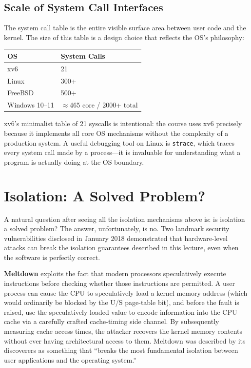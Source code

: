 \documentclass[11pt]{article}
\begin{document}
\subsection{Scale of System Call Interfaces}

The system call table is the entire visible surface area between user code and the kernel.
The size of this table is a design choice that reflects the OS's philosophy:

\begin{center}
\begin{tabular}{ll}
\toprule
\textbf{OS} & \textbf{System Calls} \\
\midrule
xv6         & 21 \\
Linux       & 300+ \\
FreeBSD     & 500+ \\
Windows 10--11 & $\approx$465 core / 2000+ total \\
\bottomrule
\end{tabular}
\end{center}

xv6's minimalist table of 21 syscalls is intentional: the course uses xv6 precisely because
it implements all core OS mechanisms without the complexity of a production system. A useful
debugging tool on Linux is \texttt{strace}, which traces every system call made by a
process---it is invaluable for understanding what a program is actually doing at the
OS boundary.

\section{Isolation: A Solved Problem?}
\label{sec:limits}

A natural question after seeing all the isolation mechanisms above is: is isolation a
solved problem? The answer, unfortunately, is no. Two landmark security vulnerabilities
disclosed in January 2018 demonstrated that hardware-level attacks can break the isolation
guarantees described in this lecture, even when the software is perfectly correct.

\textbf{Meltdown} exploits the fact that modern processors speculatively execute
instructions before checking whether those instructions are permitted. A user process can
cause the CPU to speculatively load a kernel memory address (which would ordinarily be
blocked by the U/S page-table bit), and before the fault is raised, use the speculatively
loaded value to encode information into the CPU cache via a carefully crafted cache-timing
side channel. By subsequently measuring cache access times, the attacker recovers the kernel
memory contents without ever having architectural access to them. Meltdown was described by
its discoverers as something that ``breaks the most fundamental isolation between user
applications and the operating system.''
\end{document}
